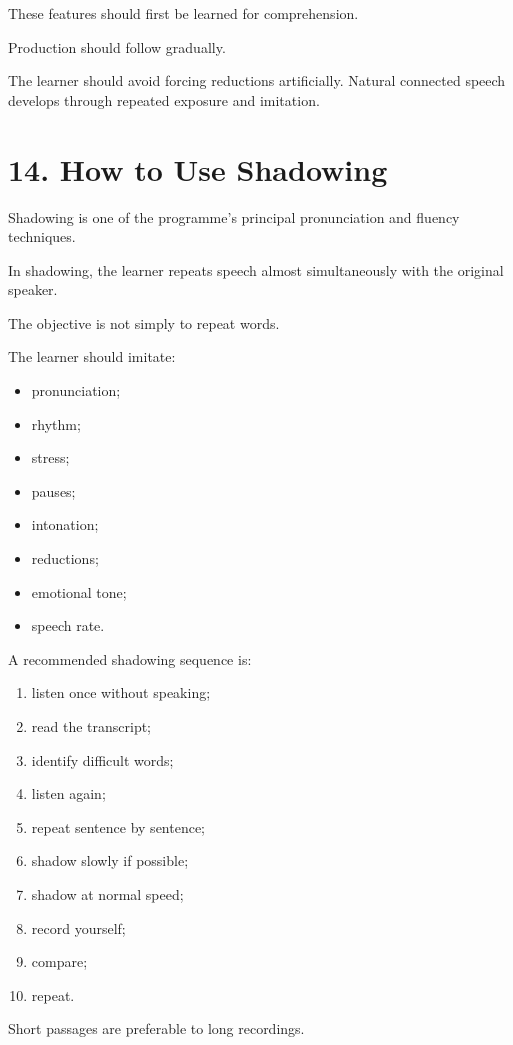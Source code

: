 These features should first be learned for comprehension.

Production should follow gradually.

The learner should avoid forcing reductions artificially. Natural connected speech develops through repeated exposure and imitation.

\section*{14. How to Use Shadowing}

Shadowing is one of the programme's principal pronunciation and fluency techniques.

In shadowing, the learner repeats speech almost simultaneously with the original speaker.

The objective is not simply to repeat words.

The learner should imitate:

\begin{itemize}
    \item pronunciation;
    \item rhythm;
    \item stress;
    \item pauses;
    \item intonation;
    \item reductions;
    \item emotional tone;
    \item speech rate.
\end{itemize}

A recommended shadowing sequence is:

\begin{enumerate}
    \item listen once without speaking;
    \item read the transcript;
    \item identify difficult words;
    \item listen again;
    \item repeat sentence by sentence;
    \item shadow slowly if possible;
    \item shadow at normal speed;
    \item record yourself;
    \item compare;
    \item repeat.
\end{enumerate}

Short passages are preferable to long recordings.

